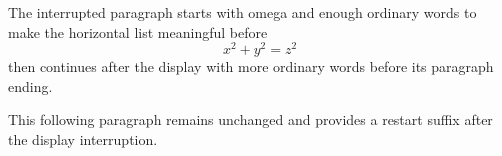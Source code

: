 
\hsize=220pt \vsize=240pt
The interrupted paragraph starts with omega and enough ordinary words to make the horizontal list meaningful before
$$x^2+y^2=z^2$$
then continues after the display with more ordinary words before its paragraph ending.

This following paragraph remains unchanged and provides a restart suffix after the display interruption.
\bye
